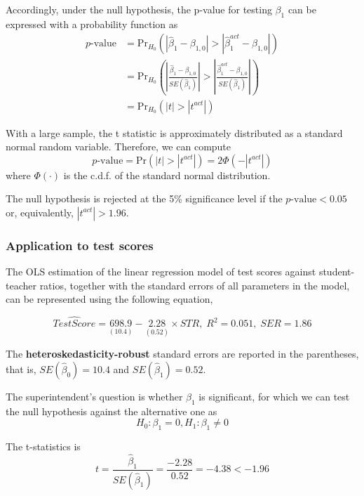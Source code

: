 \documentclass[a4paper,11pt]{article}
\newcommand{\pr}{\mathrm{Pr}}
\begin{document}
Accordingly, under the null hypothesis, the p-value for
testing \(\beta_1\) can be expressed with a probability function as
\begin{equation*}
\begin{split}
p\text{-value} &= \pr_{H_0} \left( | \hat{\beta}_1 - \beta_{1,0} | > | \hat{\beta}^{act}_1 - \beta_{1,0} | \right) \\
&= \pr_{H_0} \left( \left| \frac{\hat{\beta}_1 - \beta_{1,0}}{SE(\hat{\beta}_1)} \right| > \left| \frac{\hat{\beta}^{act}_1 - \beta_{1,0}}{SE(\hat{\beta}_1)} \right| \right) \\
&= \pr_{H_0} \left( |t| > |t^{act}| \right)
\end{split}
\end{equation*}

With a large sample, the t statistic is approximately distributed as
a standard normal random variable. Therefore, we can compute 
\[p\text{-value} = \pr\left(|t| > |t^{act}|
\right) = 2 \Phi(-|t^{act}|)\]
where \(\Phi(\cdot)\) is the c.d.f. of the standard normal
distribution. 

The null hypothesis is rejected at the 5\% significance level if the
\(p\text{-value} < 0.05\) or, equivalently, \(|t^{act}| > 1.96\). 

\subsubsection*{Application to test scores}
\label{sec:org0f495af}

The OLS estimation of the linear regression model of test scores
against student-teacher ratios, together with the standard errors of
all parameters in the model, can be represented using the following
equation, 

\begin{equation*}
\widehat{TestScore} = \underset{\displaystyle (10.4)}{698.9} - \underset{\displaystyle (0.52)}{2.28} \times STR,\; R^2 = 0.051,\; SER = 1.86
\end{equation*}

The \textbf{heteroskedasticity-robust} standard errors are reported in the
parentheses, that is, \(SE(\hat{\beta}_0) = 10.4\) and
\(SE(\hat{\beta}_1) = 0.52\). 

The superintendent's question is whether \(\beta_1\) is significant, for
which we can test the null hypothesis against the alternative one as
\[ H_0: \beta_1 = 0, H_1: \beta_1 \neq 0 \]

The t-statistics is
\[ t = \frac{\hat{\beta}_1}{SE(\hat{\beta}_1)} = \frac{-2.28}{0.52}
= -4.38 < -1.96 \] 
\end{document}
